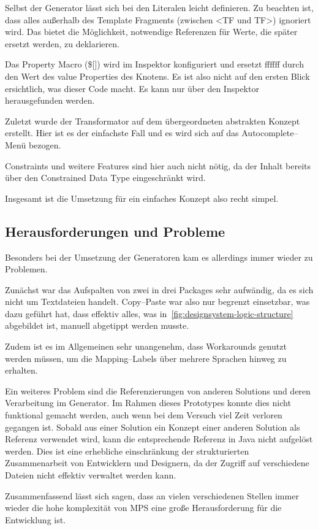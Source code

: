 
Selbst der Generator lässt sich bei den Literalen leicht definieren.
Zu beachten ist, dass alles außerhalb des {\ttfamily Template Fragment}s (zwischen {\ttfamily <TF} und {\ttfamily TF>}) ignoriert wird.
Das bietet die Möglichkeit, notwendige Referenzen für Werte, die später ersetzt werden, zu deklarieren.

Das {\ttfamily Property Macro} ({\ttfamily \$[]}) wird im Inspektor konfiguriert und ersetzt {\ttfamily ffffff} durch den Wert des {\ttfamily value} Properties des Knotens.
Es ist also nicht auf den ersten Blick ersichtlich, was dieser Code macht.
Es kann nur über den Inspektor herausgefunden werden.


Zuletzt wurde der Transformator auf dem übergeordneten abstrakten Konzept erstellt.
Hier ist es der einfachste Fall und es wird sich auf das Autocomplete--Menü bezogen.

Constraints und weitere Features sind hier auch nicht nötig, da der Inhalt bereits über den {\ttfamily Constrained Data Type} eingeschränkt wird.

Insgesamt ist die Umsetzung für ein einfaches Konzept also recht simpel.

\subsection{Herausforderungen und Probleme}\label{subsec:herausforderungen-und-probleme}
Besonders bei der Umsetzung der Generatoren kam es allerdings immer wieder zu Problemen.

Zunächst war das Aufspalten von zwei in drei Packages sehr aufwändig, da es sich nicht um Textdateien handelt.
Copy--Paste war also nur begrenzt einsetzbar, was dazu geführt hat, dass effektiv alles, was in~\autoref{fig:designsystem-logic-structure} abgebildet ist, manuell abgetippt werden musste.

Zudem ist es im Allgemeinen sehr unangenehm, dass Workarounds genutzt werden müssen, um die Mapping--Labels über mehrere Sprachen hinweg zu erhalten.

Ein weiteres Problem sind die Referenzierungen von anderen Solutions und deren Verarbeitung im Generator.
Im Rahmen dieses Prototypes konnte dies nicht funktional gemacht werden, auch wenn bei dem Versuch viel Zeit verloren gegangen ist.
Sobald aus einer Solution ein Konzept einer anderen Solution als Referenz verwendet wird, kann die entsprechende Referenz in Java nicht aufgelöst werden.
Dies ist eine erhebliche einschränkung der strukturierten Zusammenarbeit von Entwicklern und Designern, da der Zugriff auf verschiedene Dateien nicht effektiv verwaltet werden kann.

Zusammenfassend lässt sich sagen, dass an vielen verschiedenen Stellen immer wieder die hohe komplexität von \ac{MPS} eine große Herausforderung für die Entwicklung ist.
